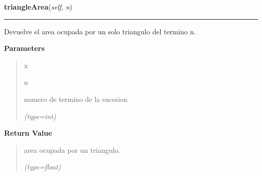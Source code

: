 \hspace{.8\funcindent}\begin{boxedminipage}{\funcwidth}

    \raggedright \textbf{triangleArea}(\textit{self}, \textit{n})

    \vspace{-1.5ex}

    \rule{\textwidth}{0.5\fboxrule}
\setlength{\parskip}{2ex}
    Devuelve el area ocupada por un solo triangulo del termino n.

\setlength{\parskip}{1ex}
      \textbf{Parameters}
      \vspace{-1ex}

      \begin{quote}
        \begin{Ventry}{x}

          \item[n]

          numero de termino de la sucesion

            {\it (type=int)}

        \end{Ventry}

      \end{quote}

      \textbf{Return Value}
    \vspace{-1ex}

      \begin{quote}
      area ocupada por un triangulo.

      {\it (type=float)}

      \end{quote}

    \end{boxedminipage}

    \label{FractalZE:sierpinsky:Sierpinsky:totalArea}

    \vspace{0.5ex}

